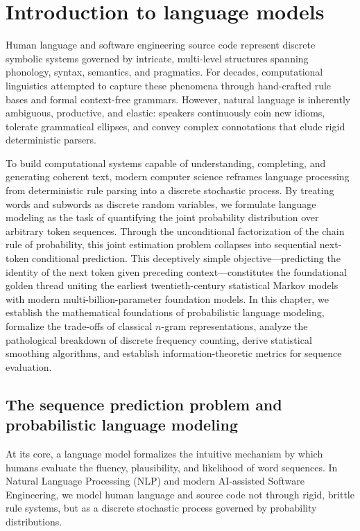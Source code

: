 \documentclass[../../main.tex]{subfiles}
\begin{document}
\chapter{Introduction to language models}
\label{ch:intro_lms}

Human language and software engineering source code represent discrete symbolic systems governed by intricate, multi-level structures spanning phonology, syntax, semantics, and pragmatics. For decades, computational linguistics attempted to capture these phenomena through hand-crafted rule bases and formal context-free grammars. However, natural language is inherently ambiguous, productive, and elastic: speakers continuously coin new idioms, tolerate grammatical ellipses, and convey complex connotations that elude rigid deterministic parsers.

To build computational systems capable of understanding, completing, and generating coherent text, modern computer science reframes language processing from deterministic rule parsing into a discrete stochastic process. By treating words and subwords as discrete random variables, we formulate language modeling as the task of quantifying the joint probability distribution over arbitrary token sequences. Through the unconditional factorization of the chain rule of probability, this joint estimation problem collapses into sequential next-token conditional prediction. This deceptively simple objective—predicting the identity of the next token given preceding context—constitutes the foundational golden thread uniting the earliest twentieth-century statistical Markov models with modern multi-billion-parameter foundation models. In this chapter, we establish the mathematical foundations of probabilistic language modeling, formalize the trade-offs of classical $n$-gram representations, analyze the pathological breakdown of discrete frequency counting, derive statistical smoothing algorithms, and establish information-theoretic metrics for sequence evaluation.

\clearpage
\section{The sequence prediction problem and probabilistic language modeling}
\label{sec:prob_lm}

At its core, a language model formalizes the intuitive mechanism by which humans evaluate the fluency, plausibility, and likelihood of word sequences. In Natural Language Processing (NLP) and modern AI-assisted Software Engineering, we model human language and source code not through rigid, brittle rule systems, but as a discrete stochastic process governed by probability distributions.
\end{document}

